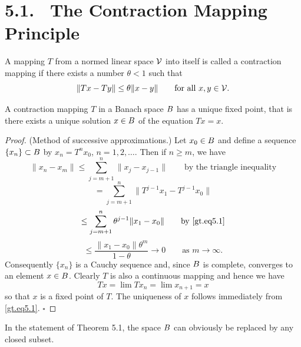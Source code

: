 \section*{5.1. \ The Contraction Mapping Principle}

\begin{definition}\label{gt.def5.1.contraction-mapping}
A mapping $T$ from a normed linear space $\V$ into itself is called a contraction mapping if there exists a number $\theta < 1$ such that
\begin{equation}\label{gt.eq5.1}\dcref{(5.1)}\group{chapter-5}\source{gilbarg-trudinger:page-0086}
\|Tx - Ty\| \leq \theta \|x - y\| \qquad \text{for all } x, y \in \V.
\end{equation}
\end{definition}

\begin{theorem}\label{gt.thm5.1}
A contraction mapping $T$ in a Banach space $\B$ has a unique fixed point, that is there exists a unique solution $x \in \B$ of the equation $Tx = x$.
\end{theorem}

\begin{proof}
(Method of successive approximations.) Let $x_0 \in \B$ and define a sequence $\{x_n\}\subset\B$ by $x_n = T^n x_0$, $n = 1, 2, \ldots$. Then if $n \geq m$, we have
\[
\|x_n - x_m\| \leq \sum_{j=m+1}^{n} \|x_j - x_{j-1}\| \qquad \text{by the triangle inequality}
\]
\[
= \sum_{j=m+1}^{n} \|T^{j-1}x_1 - T^{j-1}x_0\|
\]
\[
\leq \sum_{j=m+1}^{n} \theta^{j-1}\|x_1 - x_0\| \qquad \text{by \eqref{gt.eq5.1}}
\]
\[
\leq \frac{\|x_1 - x_0\|\theta^m}{1-\theta} \to 0 \qquad \text{as } m \to \infty.
\]
Consequently $\{x_n\}$ is a Cauchy sequence and, since $\B$ is complete, converges to an element $x \in \B$. Clearly $T$ is also a continuous mapping and hence we have
\[
Tx = \lim Tx_n = \lim x_{n+1} = x
\]
so that $x$ is a fixed point of $T$. The uniqueness of $x$ follows immediately from \eqref{gt.eq5.1}. $\square$
\end{proof}

\begin{remark}
In the statement of Theorem 5.1, the space $\B$ can obviously be replaced by any closed subset.
\end{remark}

